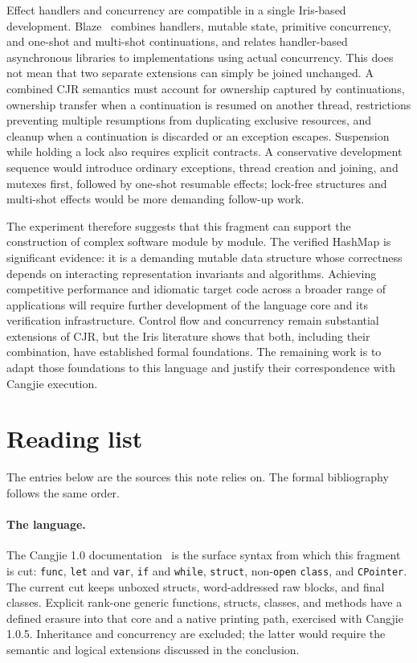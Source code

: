 \documentclass[11pt]{article}
\begin{document}
Effect handlers and concurrency are compatible in a single Iris-based development. Blaze~\cite{blaze-popl26} combines handlers, mutable state, primitive concurrency, and one-shot and multi-shot continuations, and relates handler-based asynchronous libraries to implementations using actual concurrency. This does not mean that two separate extensions can simply be joined unchanged. A combined CJR semantics must account for ownership captured by continuations, ownership transfer when a continuation is resumed on another thread, restrictions preventing multiple resumptions from duplicating exclusive resources, and cleanup when a continuation is discarded or an exception escapes. Suspension while holding a lock also requires explicit contracts. A conservative development sequence would introduce ordinary exceptions, thread creation and joining, and mutexes first, followed by one-shot resumable effects; lock-free structures and multi-shot effects would be more demanding follow-up work.

The experiment therefore suggests that this fragment can support the construction of complex software module by module. The verified HashMap is significant evidence: it is a demanding mutable data structure whose correctness depends on interacting representation invariants and algorithms. Achieving competitive performance and idiomatic target code across a broader range of applications will require further development of the language core and its verification infrastructure. Control flow and concurrency remain substantial extensions of CJR, but the Iris literature shows that both, including their combination, have established formal foundations. The remaining work is to adapt those foundations to this language and justify their correspondence with Cangjie execution.

\section{Reading list}

The entries below are the sources this note relies on.
The formal bibliography follows the same order.

\paragraph{The language.}
The Cangjie 1.0 documentation~\cite{cangjie-docs} is the surface syntax from which this fragment is cut: \texttt{func}, \texttt{let} and \texttt{var}, \texttt{if} and \texttt{while}, \texttt{struct}, non-\texttt{open} \texttt{class}, and \texttt{CPointer}.
The current cut keeps unboxed structs, word-addressed raw blocks, and final
classes. Explicit rank-one generic functions, structs, classes, and methods
have a defined erasure into that core and a native printing path, exercised
with Cangjie 1.0.5. Inheritance and concurrency are excluded; the latter
would require the semantic and logical extensions discussed in the conclusion.
\end{document}
